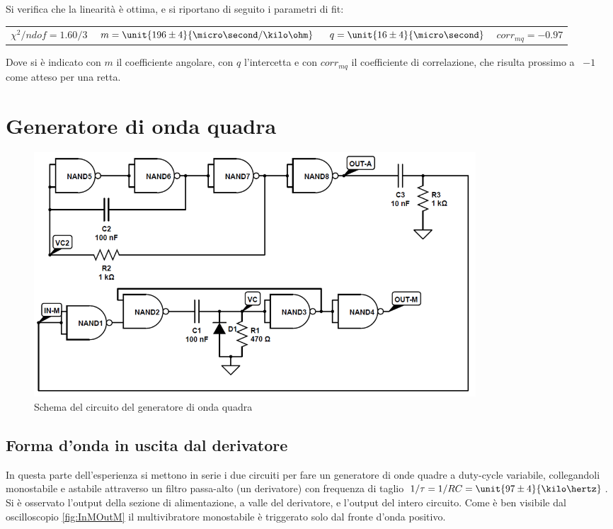 \documentclass[a4paper,10pt]{article}
\begin{document}
Si verifica che la linearità è ottima, e si riportano di seguito i parametri di fit:

\begin{table}[H]
	\centering
	\begin{tabular}{cccc}
		$\chi^2/ndof = 1.60/3$ & $m = \unit{196 \pm 4}{\micro\second / \kilo\ohm}$ & $q = \unit{16 \pm 4}{\micro\second}$ & $corr_{mq} = -0.97$\\
	\end{tabular}
\end{table}

Dove si è indicato con $m$ il coefficiente angolare, con $q$ l'intercetta e con $corr_{mq}$ il coefficiente di correlazione, che risulta prossimo a ~$-1$ come atteso per una retta.

\section{Generatore di onda quadra}

\begin{figure}[H]
	\centering
	\includegraphics[width=0.8\textwidth]{../grafici/SqGen.png}
	\caption{Schema del circuito del generatore di onda quadra}
	\label{fig:SQGEN}
\end{figure}

\subsection{Forma d'onda in uscita dal derivatore}

In questa parte dell'esperienza si mettono in serie i due circuiti per fare un generatore di onde quadre a duty-cycle variabile, collegandoli monostabile e astabile attraverso un filtro passa-alto (un derivatore) con frequenza di taglio $1/\tau=1/RC=\unit{97 \pm 4}{\kilo\hertz}$.\\
Si è osservato l'output della sezione di alimentazione, a valle del derivatore, e l'output del intero circuito. Come è ben visibile dal oscilloscopio \cref{fig:InMOutM} il multivibratore monostabile è triggerato solo dal fronte d'onda positivo. 
\end{document}
